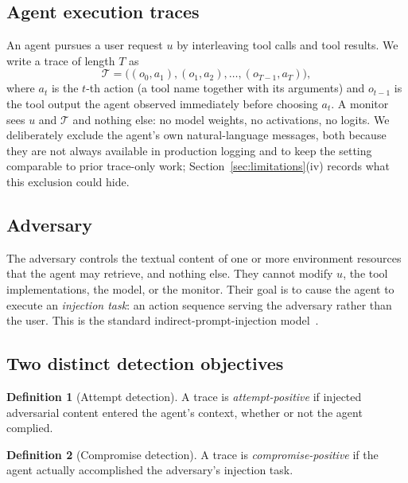 \documentclass[preprint,12pt,number]{elsarticle}
\theoremstyle{definition}
\newtheorem{definition}{Definition}
\newcommand{\Tcal}{\mathcal{T}}
\begin{document}
\subsection{Agent execution traces}

An agent pursues a user request $u$ by interleaving tool calls and tool results.
We write a trace of length $T$ as
\begin{equation}
\Tcal = \big( (o_0, a_1), (o_1, a_2), \dots, (o_{T-1}, a_T) \big),
\end{equation}
where $a_t$ is the $t$-th action (a tool name together with its arguments) and
$o_{t-1}$ is the tool output the agent observed immediately before choosing
$a_t$. A monitor sees $u$ and $\Tcal$ and nothing else: no model weights, no
activations, no logits. We deliberately exclude the agent's own
natural-language messages, both because they are not always available in
production logging and to keep the setting comparable to prior trace-only
work; Section~\ref{sec:limitations}(iv) records what this exclusion could hide.

\subsection{Adversary}

The adversary controls the textual content of one or more environment resources
that the agent may retrieve, and nothing else. They cannot modify $u$, the tool
implementations, the model, or the monitor. Their goal is to cause the agent to
execute an \emph{injection task}: an action sequence serving the adversary rather
than the user. This is the standard indirect-prompt-injection
model~\citep{debenedetti2024agentdojo}.

\subsection{Two distinct detection objectives}

\begin{definition}[Attempt detection]
A trace is \emph{attempt-positive} if injected adversarial content entered the
agent's context, whether or not the agent complied.
\end{definition}

\begin{definition}[Compromise detection]
A trace is \emph{compromise-positive} if the agent actually accomplished the
adversary's injection task.
\end{definition}
\end{document}
